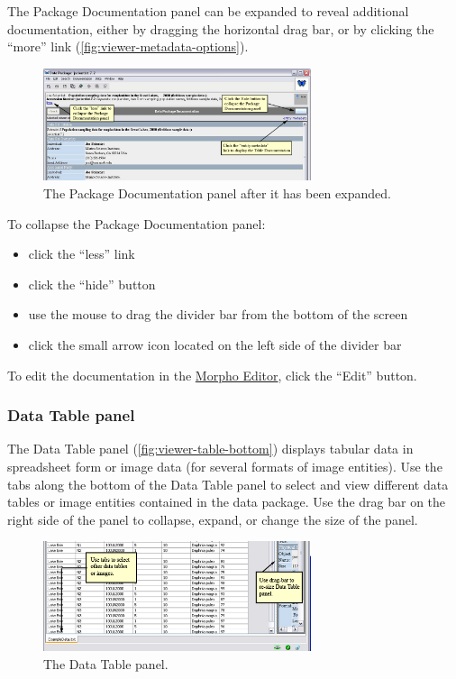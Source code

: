 The Package Documentation panel can be expanded to reveal additional
documentation, either by dragging the horizontal drag bar, or by
clicking the ``more'' link (\autoref{fig:viewer-metadata-options}).

\begin{figure}
  \centering
    \includegraphics[width=0.7\textwidth]{images/viewer-metadata-options.jpg}
  \caption{The Package Documentation panel after it has been expanded.}
  \label{fig:viewer-metadata-options}
\end{figure}


To collapse the Package Documentation panel:
\begin{itemize}
  \setlength{\parskip}{1pt}
  \item click the ``less'' link 
  \item click the ``hide'' button 
  \item use the mouse to drag the divider bar from the bottom of the
    screen
  \item click the small arrow icon located on the left side of the
    divider bar 
\end{itemize}

To edit the documentation in the \hyperref[sec:edit-doc-tree]{Morpho
Editor}, click the ``Edit'' button. 

\subsubsection{Data Table panel} \label{sec:panel-table}

The Data Table panel (\autoref{fig:viewer-table-bottom}) displays
tabular data in spreadsheet form or image data (for several formats of
image entities). Use the tabs along the bottom of the Data Table panel
to select and view different data tables or image entities contained in
the data package. Use the drag bar on the right side of the panel to
collapse, expand, or change the size of the panel.

\begin{figure}
  \centering
    \includegraphics[width=0.7\textwidth]{images/viewer-table-bottom.jpg}
  \caption{The Data Table panel.}
  \label{fig:viewer-table-bottom}
\end{figure}

